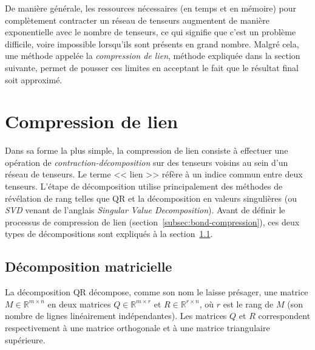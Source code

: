 De manière générale, les ressources nécessaires (en temps et en mémoire) pour complètement contracter un réseau de tenseurs augmentent de manière exponentielle avec le nombre de tenseurs, ce qui signifie que c'est un problème difficile, voire impossible lorsqu'ils sont présents en grand nombre.
Malgré cela, une méthode appelée la \emph{compression de lien}, méthode expliquée dans la section suivante, permet de pousser ces limites en acceptant le fait que le résultat final soit approximé.


\section{Compression de lien}\label{sec:compression}
Dans sa forme la plus simple, la compression de lien consiste à effectuer une opération de \emph{contraction-décomposition} sur des tenseurs voisins au sein d'un réseau de tenseurs.
Le terme << lien >> réfère à un indice commun entre deux tenseurs.
L'étape de décomposition utilise principalement des méthodes de révélation de rang telles que QR et la décomposition en valeurs singulières (ou \textit{SVD} venant de l'anglais \textit{Singular Value Decomposition}).
Avant de définir le processus de compression de lien (section~\ref{subsec:bond-compression}), ces deux types de décompositions sont expliqués à la section~\ref{subsec:QR-and-SVD}.

\subsection{Décomposition matricielle}\label{subsec:QR-and-SVD}
La décomposition QR décompose, comme son nom le laisse présager, une matrice $M \in \mathbb{R}^{m \times n}$ en deux matrices $Q \in \mathbb{R}^{m \times r}$ et $R \in \mathbb{R}^{r \times n}$, où $r$ est le rang de $M$ (son nombre de lignes linéairement indépendantes).
Les matrices $Q$ et $R$ correspondent respectivement à une matrice orthogonale et à une matrice triangulaire supérieure.

